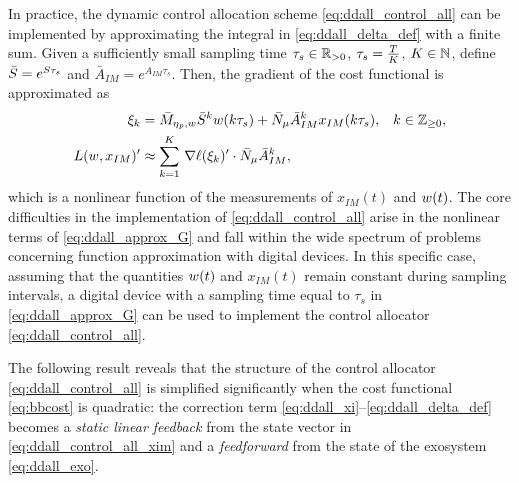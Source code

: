\begin{remark}
  \label{rem:ddall_nablaG_comp}
  In practice, the dynamic control allocation scheme \eqref{eq:ddall_control_all} can be implemented by approximating the integral in \eqref{eq:ddall_delta_def} with a finite sum. Given a sufficiently small sampling time $\tau_s\in\mathbb{R}_{>0}$, $\tau_s = \frac{T}{K}$, $K\in\mathbb{N}$, define $\bar{S} = e^{S\tau_s}$ and $\bar{A}_{IM} = e^{A_{IM}\tau_s}$. Then, the gradient of the cost functional is approximated as
  \begin{subequations}
    \label{eq:ddall_approx_G}
    \begin{align}
      \xi_k &= \bar{M}_{\eta_p,w}\bar{S}^k w(k\tau_s) + \bar{N}_{\mu}\bar{A}_{IM}^k x_{IM}(k\tau_s), & k\in\mathbb{Z}_{\geq 0},\label{eq:ddall_approx_G_xi}\\
      L(w,x_{IM})' &\approx \sum_{k = 1}^{K}\, \nabla \ell(\xi_k)' \cdot \bar{N}_{\mu}\bar{A}_{IM}^k,\label{eq:ddall_approx_G_G}
    \end{align}
  \end{subequations}
  which is a nonlinear function of the measurements of $x_{IM}(t)$ and $w(t)$. The core difficulties in the implementation of \eqref{eq:ddall_control_all} arise in the nonlinear terms of \eqref{eq:ddall_approx_G} and fall within the wide spectrum of problems concerning function approximation with digital devices. In this specific case, assuming that the quantities $w(t)$ and $x_{IM}(t)$ remain constant during sampling intervals, a digital device with a sampling time equal to $\tau_s$ in \eqref{eq:ddall_approx_G} can be used to implement the control allocator \eqref{eq:ddall_control_all}.\closeremark
\end{remark}

The following result reveals that the structure of the control allocator \eqref{eq:ddall_control_all} is simplified significantly when the cost functional \eqref{eq:bbcost} is quadratic: the correction term \eqref{eq:ddall_xi}--\eqref{eq:ddall_delta_def} becomes a \emph{static linear feedback} from the state vector in \eqref{eq:ddall_control_all_xim} and a \emph{feedforward} from the state of the exosystem \eqref{eq:ddall_exo}.

